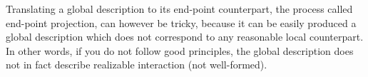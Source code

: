 Translating a global description to its end-point counterpart, the process called end-point projection, can however be tricky, because it can be easily produced a global description which does not correspond to any reasonable local counterpart. In other words, if you do not follow good principles, the global description does not in fact describe realizable interaction (not well-formed).


